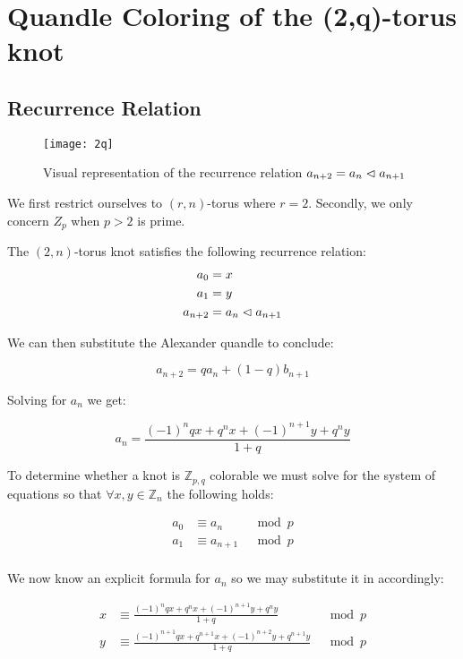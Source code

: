 \documentclass[paper.tex]{subfiles}
\begin{document}
\section{Quandle Coloring of the (2,q)-torus knot}\label{sec:2ntorus}

\subsection{Recurrence Relation}

\begin{figure}[h]
  \centering
  \texttt{[image: 2q]}
  \caption{Visual representation of the recurrence relation $a_{n+2} = a_{n} \vartriangleleft a_{n+1}$~\cite{Cusick}}\label{fig:2q}
\end{figure}

We first restrict ourselves to $(r,n)$-torus where $r = 2$. Secondly, we only concern $Z_p$ when $p > 2$ is prime.

The $(2,n)$-torus knot satisfies the following recurrence relation:
\begin{align*}
	a_0 &= x \\
	a_1 &= y \\
	a_{n+2} &= a_{n} \vartriangleleft a_{n+1} \\
\end{align*}

We can then substitute the Alexander quandle to conclude:

$$ a_{n+2} = qa_{n} + (1-q)b_{n+1} $$

Solving for $a_n$ we get:

$$ a_n = \frac{(-1)^nqx+q^nx+(-1)^{n+1}y+q^ny}{1+q} $$

To determine whether a knot is $\mathbb{Z}_{p,q}$ colorable we must solve for the system of equations so that $\forall x,y \in \mathbb{Z}_n$ the following holds:

\begin{align*}
	a_0 &\equiv a_{n}  & \mod{p} \\
	a_1 &\equiv a_{n+1} & \mod{p} \\
\end{align*}

We now know an explicit formula for $a_n$ so we may substitute it in accordingly:

\begin{align*}
	x &\equiv \frac{(-1)^nqx+q^nx+(-1)^{n+1}y+q^ny}{1+q} & \mod{p} \\
	y &\equiv \frac{(-1)^{n+1}qx+q^{n+1}x+(-1)^{n+2}y+q^{n+1}y}{1+q} & \mod{p} \\
\end{align*}
\end{document}
